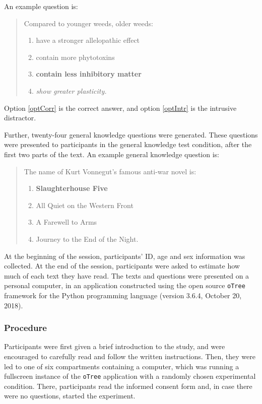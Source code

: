 \documentclass[11pt,]{article}
\begin{document}
An example question is:

\begin{quotation}
\noindent Compared to younger weeds, older weeds:
\begin{enumerate}[label = (\alph*)]
\item have a stronger allelopathic effect
\item contain more phytotoxins
\item \label{optCorr} \textbf{contain less inhibitory matter}
\item \label{optIntr} \textit{show greater plasticity.}
\end{enumerate}
\end{quotation}

Option \ref{optCorr} is the correct answer, and option \ref{optIntr} is
the intrusive distractor.

Further, twenty-four general knowledge questions were generated. These
questions were presented to participants in the general knowledge test
condition, after the first two parts of the text. An example general
knowledge question is:

\begin{quotation}
\noindent The name of Kurt Vonnegut's famous anti-war novel is:
\begin{enumerate}[label = (\alph*)]
\item \textbf{Slaughterhouse Five}
\item All Quiet on the Western Front
\item A Farewell to Arms
\item Journey to the End of the Night.
\end{enumerate}
\end{quotation}

At the beginning of the session, participants' ID, age and sex
information was collected. At the end of the session, participants were
asked to estimate how much of each text they have read. The texts and
questions were presented on a personal computer, in an application
constructed using the open source \texttt{oTree} framework
\citep[version 2.1.35,][]{chen_otreeopen-source_2016} for the Python
programming language (version 3.6.4, October 20, 2018).

\hypertarget{procedure}{%
\subsubsection{Procedure}\label{procedure}}

Participants were first given a brief introduction to the study, and
were encouraged to carefully read and follow the written instructions.
Then, they were led to one of six compartments containing a computer,
which was running a fullscreen instance of the \texttt{oTree}
application with a randomly chosen experimental condition. There,
participants read the informed consent form and, in case there were no
questions, started the experiment.
\end{document}

